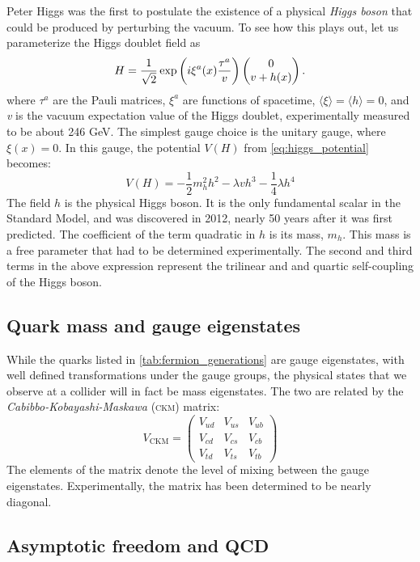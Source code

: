 Peter Higgs was the first to postulate the existence of a physical \emph{Higgs boson} that could be produced by perturbing the vacuum. To see how this plays out, let us parameterize the Higgs doublet field as 
\[H = \frac{1}{\sqrt{2}}\exp\left(i\xi^a(x)\frac{\tau^a}{v}\right)\begin{pmatrix} 0 \\ v + h(x)\end{pmatrix}.\]
where $\tau^a$ are the Pauli matrices, $\xi^a$ are functions of spacetime, $\langle\xi\rangle=\langle h\rangle=0$, and \emph{v} is the vacuum expectation value of the Higgs doublet, experimentally measured to be about 246 GeV. The simplest gauge choice is the unitary gauge, where $\xi(x)=0$. In this gauge, the potential $V(H)$ from \eqref{eq:higgs_potential} becomes:
\[V(H) = -\frac{1}{2}m_h^2 h^2 - \lambda vh^3 -\frac{1}{4}\lambda h^4\]
The field $h$ is the physical Higgs boson. It is the only fundamental scalar in the Standard Model, and was discovered in 2012, nearly 50 years after it was first predicted. The coefficient of the term quadratic in $h$ is its mass, $m_h$. This mass is a free parameter that had to be determined experimentally. The second and third terms in the above expression represent the trilinear and and quartic self-coupling of the Higgs boson.
\subsection{Quark mass and gauge eigenstates}
While the quarks listed in \autoref{tab:fermion_generations} are gauge eigenstates, with well defined transformations under the gauge groups, the physical states that we observe at a collider will in fact be mass eigenstates. The two are related by the \emph{Cabibbo-Kobayashi-Maskawa} (\textsc{ckm}) matrix:
\begin{equation}
  V_\text{CKM} =
  \begin{pmatrix}
    V_{ud} & V_{us} & V_{ub}\\
    V_{cd} & V_{cs} & V_{cb}\\
    V_{td} & V_{ts} & V_{tb}
  \end{pmatrix}
\end{equation}
The elements of the matrix denote the level of mixing between the gauge eigenstates. Experimentally, the matrix has been determined to be nearly diagonal.

\subsection{Asymptotic freedom and QCD}

